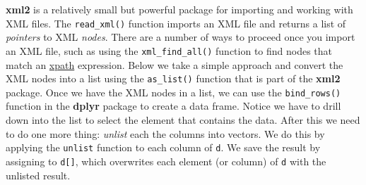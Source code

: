 \documentclass[
]{book}
\newenvironment{Shaded}{\begin{snugshade}}{\end{snugshade}}
\newcommand{\CommentTok}[1]{\textcolor[rgb]{0.56,0.35,0.01}{\textit{#1}}}
\newcommand{\DecValTok}[1]{\textcolor[rgb]{0.00,0.00,0.81}{#1}}
\newcommand{\ErrorTok}[1]{\textcolor[rgb]{0.64,0.00,0.00}{\textbf{#1}}}
\newcommand{\FunctionTok}[1]{\textcolor[rgb]{0.00,0.00,0.00}{#1}}
\newcommand{\NormalTok}[1]{#1}
\newcommand{\OtherTok}[1]{\textcolor[rgb]{0.56,0.35,0.01}{#1}}
\newcommand{\SpecialCharTok}[1]{\textcolor[rgb]{0.00,0.00,0.00}{#1}}
\newcommand{\StringTok}[1]{\textcolor[rgb]{0.31,0.60,0.02}{#1}}
\begin{document}
\textbf{xml2} is a relatively small but powerful package for importing and working with XML files. The \texttt{read\_xml()} function imports an XML file and returns a list of \emph{pointers} to XML \emph{nodes}. There are a number of ways to proceed once you import an XML file, such as using the \texttt{xml\_find\_all()} function to find nodes that match an \href{https://www.w3schools.com/xml/xpath_intro.asp}{xpath} expression. Below we take a simple approach and convert the XML nodes into a list using the \texttt{as\_list()} function that is part of the \textbf{xml2} package. Once we have the XML nodes in a list, we can use the \texttt{bind\_rows()} function in the \textbf{dplyr} package to create a data frame. Notice we have to drill down into the list to select the element that contains the data. After this we need to do one more thing: \emph{unlist} each the columns into vectors. We do this by applying the \texttt{unlist} function to each column of \texttt{d}. We save the result by assigning to \texttt{d{[}{]}}, which overwrites each element (or column) of \texttt{d} with the unlisted result.

\begin{Shaded}
\end{Shaded}
\end{document}
